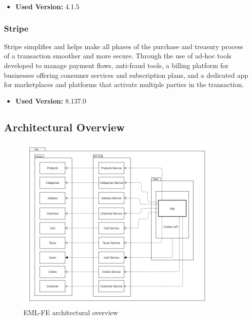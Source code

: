\begin{itemize}
    \item \textbf{Used Version:} 4.1.5
\end{itemize}

\subsubsection{Stripe}
Stripe simplifies and helps make all phases of the purchase and treasury process of a transaction smoother and more secure. Through the use of ad-hoc tools developed to manage payment flows, anti-fraud tools, a billing platform for businesses offering consumer services and subscription plans, and a dedicated app for marketplaces and platforms that activate multiple parties in the transaction.

\begin{itemize}
    \item \textbf{Used Version:} 8.137.0
\end{itemize}

\subsection{Architectural Overview} \label{_feArchitecture}

\begin{figure}[H]
    \centering
    \includegraphics[width=0.9\textwidth]{res/images/frontend-diagrams/EML-FE.jpg}
    \caption{EML-FE architectural overview}
\end{figure}


